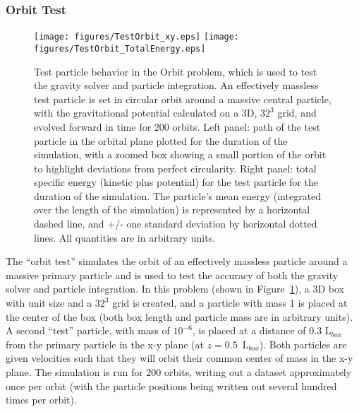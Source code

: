 \subsubsection{Orbit Test}
\label{sec.test.testorbit}

\begin{figure}
\begin{center}
\texttt{[image: figures/TestOrbit\_xy.eps]}
\texttt{[image: figures/TestOrbit\_TotalEnergy.eps]}
\caption{Test particle behavior in the Orbit problem, which is used to
test the gravity solver and particle integration.  An effectively
massless test particle is set in circular orbit around a massive
central particle, with the gravitational potential calculated on a 3D,
$32^3$ grid, and evolved forward in time for 200 orbits.  Left panel:
path of the test particle in the orbital plane plotted for the
duration of the simulation, with a zoomed box showing a small portion
of the orbit to highlight deviations from perfect circularity.  Right
panel: total specific energy (kinetic plus potential) for the test
particle for the duration of the simulation.  The particle's mean
energy (integrated over the length of the simulation) is represented
by a horizontal dashed line, and +/- one standard deviation by
horizontal dotted lines.  All quantities are in arbitrary units.}
\label{fig.orbittest}
\end{center}
\end{figure}

The ``orbit test'' simulates the orbit of an effectively massless
particle around a massive primary particle and is used to test the
accuracy of both the gravity solver and particle integration.  In this
problem (shown in Figure~\ref{fig.orbittest}), a 3D box with unit size
and a $32^3$ grid is created, and a particle with mass 1 is placed at
the center of the box (both box length and particle mass are in
arbitrary units).  A second ``test'' particle, with mass of $10^{-6}$,
is placed at a distance of 0.3 L$_{box}$ from the primary particle in
the x-y plane (at $z=0.5$~L$_{box}$).  Both particles are given
velocities such that they will orbit their common center of mass in
the x-y plane.  The simulation is run for 200 orbits, writing out a
dataset approximately once per orbit (with the particle positions
being written out several hundred times per orbit).


